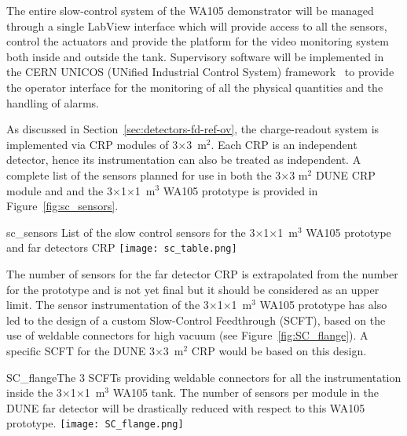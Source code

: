 The entire slow-control system of the WA105 demonstrator will be
managed through a single LabView interface\cite{WA105_SREP} which
will provide access to all the sensors, control the actuators and
provide the platform for the video monitoring system both inside and
outside the tank.  Supervisory software will be implemented in the
CERN UNICOS (UNified Industrial Control System)
framework~\cite{unicos} to provide the operator interface for the
monitoring of all the physical quantities and the handling of alarms.

As discussed in Section~\ref{sec:detectors-fd-ref-ov}, the
charge-readout system is implemented via CRP modules of
3$\times$3~m$^2$. Each CRP is an independent detector, hence its
instrumentation can also be treated as independent. A complete list of
the sensors planned for use in both the 3$\times$3 m$^2$ DUNE CRP
module and and the 3$\times$1$\times$1~m$^3$ WA105 prototype is
provided in Figure~\ref{fig:sc_sensors}.
\begin{cdrfigure}{sc_sensors}
{List of the slow control sensors for the 3$\times$1$\times$1~m$^3$ WA105 prototype and far detectors CRP}
 \texttt{[image: sc\_table.png]} 
 \end{cdrfigure}

The number of sensors for the far detector CRP is extrapolated from
the number for the prototype and is not yet final but it should be
considered as an upper limit. The sensor instrumentation of the
3$\times$1$\times$1~m$^3$ WA105 prototype has also led to the design
of a custom Slow-Control Feedthrough (SCFT), based on the use of
weldable connectors for high vacuum (see
Figure~\ref{fig:SC_flange}). A specific SCFT for the DUNE
3$\times$3~m$^2$ CRP would be based on this design.
\begin{cdrfigure}{SC_flange}{The 3 SCFTs providing 
weldable connectors for all the instrumentation inside the 3$\times$1$\times$1~m$^3$  WA105 tank. 
The number of sensors per module in the DUNE far detector will be drastically 
reduced with respect to this WA105 prototype.}
  \texttt{[image: SC\_flange.png]}
 \end{cdrfigure}
